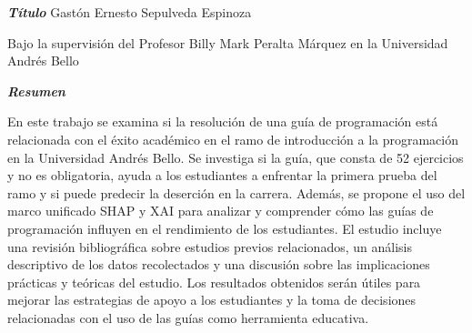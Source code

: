 \begin{center}
    \textbf{\LARGE \textit{Título}}
    \vfill
    Gastón Ernesto Sepulveda Espinoza

    Bajo la supervisión del Profesor Billy Mark Peralta Márquez en la Universidad Andrés Bello

\end{center}
\vfill
\begin{center}
    \textbf{\LARGE \textit{Resumen}}
\end{center}

En este trabajo se examina si la resolución de una guía de programación está relacionada con el éxito académico en el ramo de introducción a la programación en la Universidad Andrés Bello. Se investiga si la guía, que consta de 52 ejercicios y no es obligatoria, ayuda a los estudiantes a enfrentar la primera prueba del ramo y si puede predecir la deserción en la carrera. 
Además, se propone el uso del marco unificado SHAP y XAI para analizar y comprender cómo las guías de programación influyen en el rendimiento de los estudiantes. El estudio incluye una revisión bibliográfica sobre estudios previos relacionados, un análisis descriptivo de los datos recolectados y una discusión sobre las implicaciones prácticas y teóricas del estudio. 
Los resultados obtenidos serán útiles para mejorar las estrategias de apoyo a los estudiantes y la toma de decisiones relacionadas con el uso de las guías como herramienta educativa.
\vfill